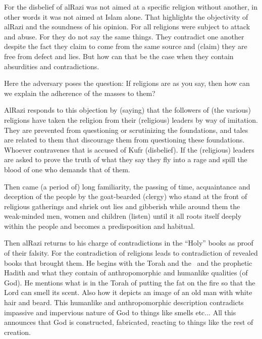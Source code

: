 \documentclass[12pt]{memoir}
\begin{document}

For the disbelief of al\–Razi was not aimed at a specific religion
without another, in other words it was not aimed at Islam alone.
That highlights the objectivity of al\–Razi and the soundness of his opinion.
For all religions were subject to attack and abuse.
For they do not say the same things.
They contradict one another despite the fact they claim to come from the same
source and (claim) they are free from defect and lies.
But how can that be the case when they contain absurdities and contradictions.

Here the adversary poses the question: If religions are as you say,
then how can we explain the adherence of the masses to them?

Al\–Razi responds to this objection by (saying) that the followers of
(the various) religions have taken the religion from their
(religious) leaders by way of imitation.
They are prevented from questioning or scrutinizing the foundations,
and tales are related to them that discourage them
from questioning these foundations.
Whoever contravenes that is accused of Kufr (disbelief).
If the (religious) leaders are asked to prove the truth of what they say
they fly into a rage and spill the blood of one who demands that of them.

Then came (a period of) long familiarity, the passing of time,
acquaintance and deception of the people by the goat-bearded (clergy)
who stand at the front of religious gatherings and shriek out
lies and gibberish while around them the weak-minded men, women and children
(listen) until it all roots itself deeply within the people and
becomes a predisposition and habitual.\fnmark


Then al\–Razi returns to his charge of contradictions in the “Holy” books
as proof of their falsity.
For the contradiction of religions leads to contradiction of
revealed books that brought them.
He begins with the Torah and the \Quran\ and the prophetic Hadith and
what they contain of anthropomorphic and human\–like qualities (of God).
He mentions what is in the Torah of putting the fat on the fire
so that the Lord can smell its scent.
Also how it depicts an image of an old man with white hair and beard.
This human\–like and anthropomorphic description contradicts impassive and
impervious nature of God to things like smells etc...
All this announces that God is constructed, fabricated,
reacting to things like the rest of creation.
\end{document}
